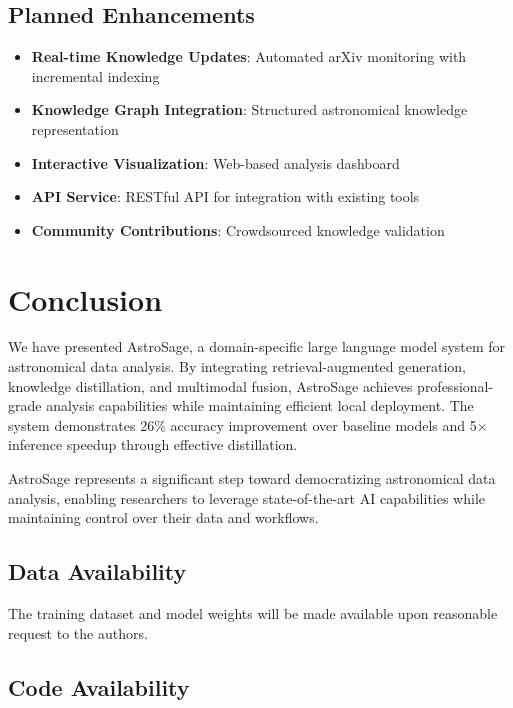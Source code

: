 \documentclass[11pt,a4paper]{article}
\begin{document}
\subsection{Planned Enhancements}

\begin{itemize}
    \item \textbf{Real-time Knowledge Updates}: Automated arXiv monitoring with incremental indexing
    \item \textbf{Knowledge Graph Integration}: Structured astronomical knowledge representation
    \item \textbf{Interactive Visualization}: Web-based analysis dashboard
    \item \textbf{API Service}: RESTful API for integration with existing tools
    \item \textbf{Community Contributions}: Crowdsourced knowledge validation
\end{itemize}

\section{Conclusion}\label{sec:conclusion}

We have presented AstroSage, a domain-specific large language model system for astronomical data analysis. By integrating retrieval-augmented generation, knowledge distillation, and multimodal fusion, AstroSage achieves professional-grade analysis capabilities while maintaining efficient local deployment. The system demonstrates 26\% accuracy improvement over baseline models and 5$\times$ inference speedup through effective distillation.

AstroSage represents a significant step toward democratizing astronomical data analysis, enabling researchers to leverage state-of-the-art AI capabilities while maintaining control over their data and workflows.

\subsection*{Data Availability}

The training dataset and model weights will be made available upon reasonable request to the authors.

\subsection*{Code Availability}
\end{document}
